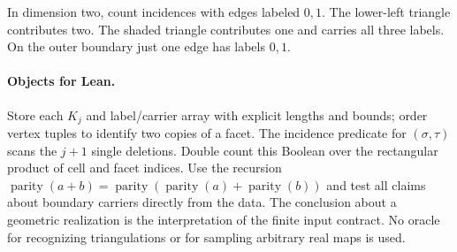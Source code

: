 \begin{center}
\begin{minipage}{.36\linewidth}\centering
{}
\end{minipage}\begin{minipage}{.54\linewidth}\small
In dimension two, count incidences with edges labeled $0,1$. The lower-left triangle contributes two. The shaded triangle contributes one and carries all three labels. On the outer boundary just one edge has labels $0,1$.
\end{minipage}
\end{center}

\paragraph{Objects for Lean.} Store each $K_j$ and label/carrier array with explicit lengths and bounds; order vertex tuples to identify two copies of a facet. The incidence predicate for $(\sigma,\tau)$ scans the $j+1$ single deletions. Double count this Boolean over the rectangular product of cell and facet indices. Use the recursion $\operatorname{parity}(a+b)=\operatorname{parity}(\operatorname{parity}(a)+\operatorname{parity}(b))$ and test all claims about boundary carriers directly from the data. The conclusion about a geometric realization is the interpretation of the finite input contract. No oracle for recognizing triangulations or for sampling arbitrary real maps is used.
